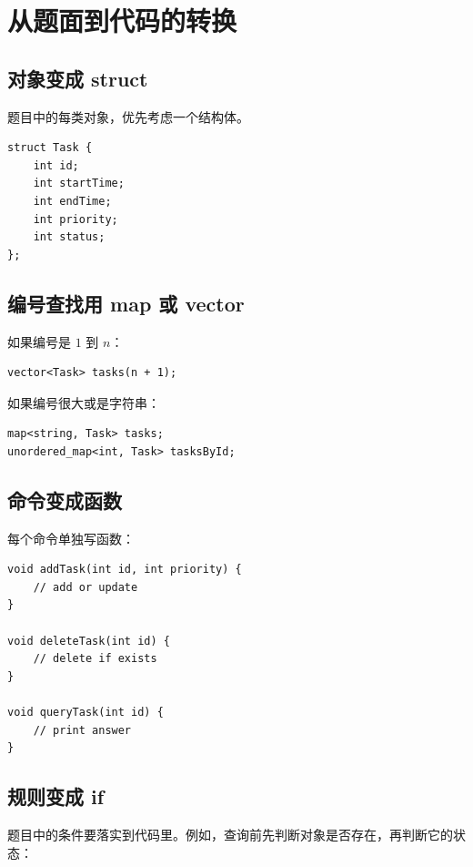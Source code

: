 \section{从题面到代码的转换}\label{sec:07-4}

\subsection{对象变成 struct}

题目中的每类对象，优先考虑一个结构体。

\begin{lstlisting}
struct Task {
    int id;
    int startTime;
    int endTime;
    int priority;
    int status;
};
\end{lstlisting}

\subsection{编号查找用 map 或 vector}

如果编号是 $1$ 到 $n$：

\begin{lstlisting}
vector<Task> tasks(n + 1);
\end{lstlisting}

如果编号很大或是字符串：

\begin{lstlisting}
map<string, Task> tasks;
unordered_map<int, Task> tasksById;
\end{lstlisting}

\subsection{命令变成函数}

每个命令单独写函数：

\begin{lstlisting}
void addTask(int id, int priority) {
    // add or update
}

void deleteTask(int id) {
    // delete if exists
}

void queryTask(int id) {
    // print answer
}
\end{lstlisting}

\subsection{规则变成 if}

题目中的条件要落实到代码里。例如，查询前先判断对象是否存在，再判断它的状态：

